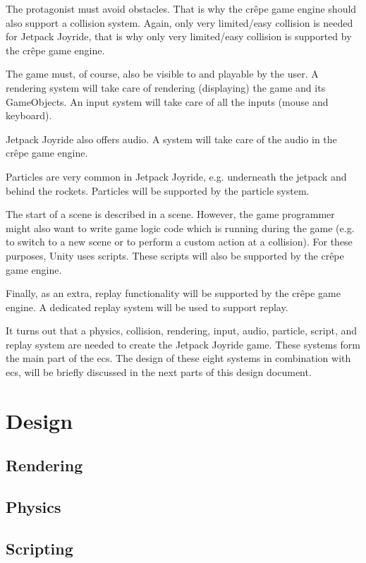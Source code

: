 \documentclass{projdoc}
\begin{document}
The protagonist must avoid obstacles. That is why the cr\^epe game engine should
also support a collision system. Again, only very limited/easy collision is needed
for Jetpack Joyride, that is why only very limited/easy collision is supported
by the cr\^epe game engine.

The game must, of course, also be visible to and playable by the user. A rendering
system will take care of rendering (displaying) the game and its GameObjects. An
input system will take care of all the inputs (mouse and keyboard).

Jetpack Joyride also offers audio. A system will take care of the audio in the cr\^epe
game engine.

Particles are very common in Jetpack Joyride, e.g. underneath the jetpack and behind
the rockets. Particles will be supported by the particle system.

The start of a scene is described in a scene. However, the game programmer might also
want to write game logic code which is running during the game (e.g. to switch to a
new scene or to perform a custom action at a collision). For these purposes, Unity
uses scripts. These scripts will also be supported by the cr\^epe game engine.

Finally, as an extra, replay functionality will be supported by the cr\^epe game
engine. A dedicated replay system will be used to support replay.

It turns out that a physics, collision, rendering, input, audio, particle, script,
and replay system are needed to create the Jetpack Joyride game. These systems form
the main part of the \gls{ecs}. The design of these eight systems in combination with
\gls{ecs}, will be briefly discussed in the next parts of this design document.

\section{Design}

\subsection{Rendering}

\subsection{Physics}

\subsection{Scripting}
\end{document}
